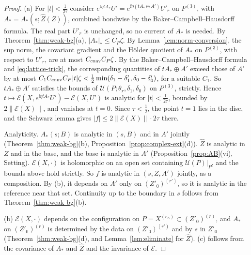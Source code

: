 \begin{proof}
(a) For $|t|<\frac1{2\tau}$ consider $e^{\ii\eta tA_*}U'=e^{\ii\eta(tA_*\oplus A')}U'_r$ on $P^{(3)}$, with $A_*=A_*(s;\hat Z(Z))$, combined bondwise by the Baker--Campbell--Hausdorff formula. The real part $U'_r$ is unchanged, so no current of $A_*$ is needed. By Theorem~\ref{thm:weak-bg}(a), $|A_*|_*\le C_P\zeta$. By Lemma~\ref{lem:norm-conversion}, the sup norm, the covariant gradient and the H\"older quotient of $A_*$ on $P^{(3)}$, with respect to $U'_r$, are at most $C_{\rm conv}C_P\zeta$. By the Baker--Campbell--Hausdorff formula and \eqref{eq:lattice-trick}, the corresponding quantities of $tA_*\oplus A'$ exceed those of $A'$ by at most $C_1C_{\rm conv}C_P|t|\zeta<\frac12\min(\delta_1-\delta'_1,\delta_0-\delta'_0)$, for a suitable $C_1$. So $tA_*\oplus A'$ satisfies the bounds of $\mathcal U(P;\theta_r,\delta_1,\delta_0)$ on $P^{(3)}$, strictly. Hence $t\mapsto\mathcal E(X,e^{\ii\eta tA_*}U')-\mathcal E(X,U')$ is analytic for $|t|<\frac1{2\tau}$, bounded by $2\|\mathcal E(X)\|$, and vanishes at $t=0$. Since $\tau<\frac12$, the point $t=1$ lies in the disc, and the Schwarz lemma gives $|f|\le2\|\mathcal E(X)\|\cdot2\tau$ there.

Analyticity. $A_*(s;B)$ is analytic in $(s,B)$ and in $A'$ jointly (Theorem~\ref{thm:weak-bg}(b), Proposition~\ref{prop:complex-ext}(d)). $\hat Z$ is analytic in $Z$ and in the base, and the base is analytic in $A'$ (Proposition~\ref{prop:AB}(vi), Setting). $\mathcal E(X,\cdot)$ is holomorphic on an open set containing $\mathcal U(P)|_P$, and the bounds above hold strictly. So $f$ is analytic in $(s,Z,A')$ jointly, as a composition. By (b), it depends on $A'$ only on $(Z'_0)^{(r')}$, so it is analytic in the reference near that set. Continuity up to the boundary in $s$ follows from Theorem~\ref{thm:weak-bg}(b).

(b) $\mathcal E(X,\cdot)$ depends on the configuration on $P=X^{(r_E)}\subset(Z'_0)^{(r)}$, and $A_*$ on $(Z'_0)^{(r)}$ is determined by the data on $(Z'_0)^{(r')}$ and by $s$ in $Z'_0$ (Theorem~\ref{thm:weak-bg}(d), and Lemma~\ref{lem:eliminate} for $\hat Z$). (c) follows from the covariance of $A_*$ and $\hat Z$ and the invariance of $\mathcal E$.
\end{proof}

